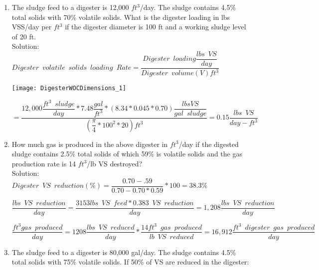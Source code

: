 \begin{enumerate}
\item The sludge feed to a digester is 12,000 $ft^3$/day.  The sludge contains 4.5\% total solids with 70\% volatile solids.  What is the digester loading in lbs VSS/day per $ft^3$ if the digester diameter is 100 ft and a working sludge level of 20 ft.\\
	
Solution:\\
{
$
	Digester \enspace volatile \enspace solids 			\enspace loading \enspace Rate = 					\dfrac
	{
	Digester \enspace loading 
		\dfrac
		{
		lbs \enspace VS
		}
		{
		day
		}
	}
	{
	Digester \enspace volume (V)ft^3
	}
$
}\\

\begin{center}
\texttt{[image: DigesterWOCDimensions\_1]}
\end{center}

{
$=\dfrac
	{
		12,000
		\dfrac
			{
			ft^3 \enspace sludge
			}
			{
			day
			}
		*7.48 \dfrac
				{
				gal
				}
				{
				ft^3
				}	
		*(8.34*0.045*0.70) 
		\dfrac
			{lbs VS}
			{gal \enspace  sludge}
	}
	{
		(	\dfrac
			{
			\pi
			}
			{
			4
			}
			*100^2*20
		)
		ft^3
	}
=\boxed
	{
		0.15 \dfrac
			{
			lbs \enspace VS
			}
			{
			day-ft^3
			}
	}
$}\\

\item How much gas is produced in the above digester in $ft^3$/day if the digested sludge contains 2.5\% total solids of which 59\% is volatile solids and the gas production rate is 14 $ft^3$/lb VS destroyed?\\
Solution:\\

{
$
Digester \enspace VS \enspace reduction (\%)=
	\dfrac
	{0.70 - .59}
	{0.70 - 0.70 *0.59}
	*100=38.3\%
$
}\\
\vspace{6mm}

{
$
	\dfrac
	{
	lbs \enspace VS \enspace reduction
	}
	{
	day
	}
	=
	\dfrac
	{
	3153 lbs \enspace VS \enspace feed
		*  0.383 \enspace VS \enspace reduction
	}
	{
	day
	}
 	=1,208
	\dfrac
	{
	lbs \enspace VS \enspace reduction
	}
	{
	day 
	}
$
}\\
\vspace{6mm}

{
$
	\dfrac 
	{
	ft^3 gas \enspace produced
	}
	{
	day
	}
	=
	1208 \dfrac
			{
			lbs \enspace VS \enspace reduced
			}
			{
			day
			}
			*
		\dfrac
		{
		14 ft^3 \enspace gas \enspace produced
		}
		{
		lb \enspace VS \enspace reduced
		}
		=16,912 \dfrac
				{
				ft^3 \enspace digester \enspace 					gas \enspace produced
				}
				{
				day
				}
$
} 
\item The sludge feed to a digester is 80,000 gal/day. The sludge contains 4.5\% total solids with 75\% volatile solids. If 50\% of VS are reduced in the digester: 




\end{enumerate}

